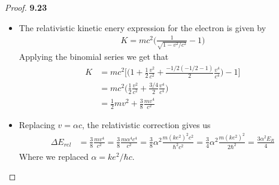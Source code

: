 \documentclass[11pt]{article}
\theoremstyle{definition}
\begin{document}
\cleardoublepage
\begin{proof}{\textbf{9.23}}
\begin{itemize}
\item [\textbf{(a)}] The relativistic kinetic enery expression for the
electron is given by
\begin{align*}
    K = mc^2\bigg(\frac{1}{\sqrt{1 - v^2/c^2}} - 1\bigg)
\end{align*}
Applying the binomial series we get that
\begin{align*}
    K &= mc^2\bigg[\bigg(1 + \frac{1}{2}\frac{v^2}{c^2}
    + \frac{-1/2(-1/2 - 1)}{2}\frac{v^4}{c^4}\bigg) - 1\bigg]\\
    &= mc^2\bigg(
    \frac{1}{2}\frac{v^2}{c^2}
    + \frac{3/4}{2}\frac{v^4}{c^4}\bigg)\\
    &= \frac{1}{2}mv^2
    + \frac{3}{8}\frac{mv^4}{c^2}
\end{align*}
\item [\textbf{(b)}] Replacing $v = \alpha c$, the relativistic correction
gives us
\begin{align*}
    \Delta E_{rel} &= \frac{3}{8}\frac{mv^4}{c^2}
    = \frac{3}{8}\frac{m\alpha^4 c^4}{c^2}
    = \frac{3}{8}\alpha^2\frac{m(ke^2)^2 c^2}{\hbar^2 c^2}
    = \frac{3}{4}\alpha^2\frac{m(ke^2)^2}{2\hbar^2}
    = \frac{3\alpha^2E_R}{4}
\end{align*}
Where we replaced $\alpha = ke^2/\hbar c$.
\end{itemize}
\end{proof}
\end{document}
